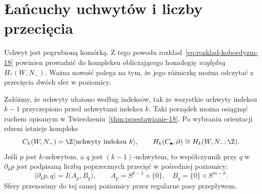 \section{Łańcuchy uchwytów i liczby przecięcia}
\label{sec:lancuchy-uchwytow-18}

Uchwyt jest pogrubioną komórką. Z tego powodu
rozkład~\eqref{eq:rozklad-kobordyzm-18} powinien
prowadzić do kompleksu obliczającego homologię
\emph{względną} $H_*(W,N_-)$. Ważna nowość
polega na tym, że jego różniczkę można odczytać
z przecięcia dwóch sfer w poziomicy.

\begin{twierdzenie}
\label{thm:kompleks-uchwytow-18}
Załóżmy, że uchwyty ułożono według indeksów,
tak że wszystkie uchwyty indeksu $k-1$
przyczepiono przed uchwytami indeksu $k$.
Taki porządek można osiągnąć ruchem opisanym
w Twierdzeniu~\ref{thm:przestawianie-18}.
Po wybraniu orientacji rdzeni istnieje kompleks
\[
 C_k(W,N_-)=\Z\langle
       \text{uchwyty indeksu }k\rangle,
 \qquad H_k(C_\bullet,\partial)\cong H_k(W,N_-;\Z).
\]
Jeśli $p$ jest $k$-uchwytem, a $q$ jest
$(k-1)$-uchwytem, to współczynnik przy $q$
w $\partial_k p$ jest podpisaną liczbą
poprzecznych przecięć w pośredniej poziomicy:
\begin{equation}\label{eq:macierz-uchwyty-18}
 \langle\partial_kp,q\rangle
 = I\bigl(A_p,B_q\bigr),\qquad
 A_p=S^{k-1}\times\{0\},\quad
 B_q=\{0\}\times S^{m-k}.
\end{equation}
Sfery przenosimy do tej samej poziomicy
przez regularne pasy przepływem.
\end{twierdzenie}
